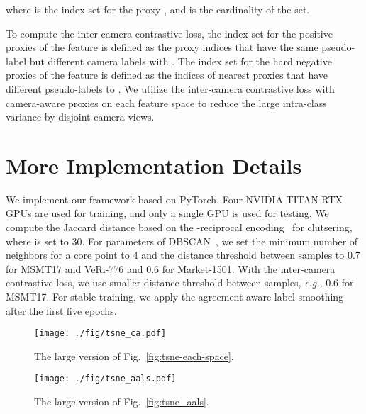 \documentclass[10pt,twocolumn,letterpaper]{article}
\begin{document}
    where  is the index set for the proxy , and  is the cardinality of the set.
    
    To compute the inter-camera contrastive loss, the index set  for the positive proxies of the feature  is defined as the proxy indices that have the same pseudo-label  but different camera labels with .
    The index set  for the hard negative proxies of the feature  is defined as the indices of nearest proxies that have different pseudo-labels to .
    We utilize the inter-camera contrastive loss with camera-aware proxies on each feature space to reduce the large intra-class variance by disjoint camera views.
     \section{More Implementation Details}
\label{sec:implement_details}
    We implement our framework based on PyTorch.
    Four NVIDIA TITAN RTX GPUs are used for training, and only a single GPU is used for testing.
    We compute the Jaccard distance based on the -reciprocal encoding~\cite{zhong2017re} for clutsering, where  is set to 30.
    For parameters of DBSCAN~\cite{ester1996density}, we set the minimum number of neighbors for a core point to 4 and the distance threshold between samples to 0.7 for MSMT17 and VeRi-776 and 0.6 for Market-1501.
    With the inter-camera contrastive loss, we use smaller distance threshold between samples, \textit{e.g.}, 0.6 for MSMT17.
    For stable training, we apply the agreement-aware label smoothing after the first five epochs.
 \begin{figure*}[t]
    \centering
    \texttt{[image: ./fig/tsne\_ca.pdf]}
    \caption{ 
    The large version of Fig.~\ref{fig:tsne-each-space}.
    }
    \label{fig:tsne-each-space-large}
\end{figure*}

\begin{figure*}[t]
    \centering
    \texttt{[image: ./fig/tsne\_aals.pdf]}
    \caption{ 
    The large version of Fig.~\ref{fig:tsne_aals}.
    }
    \label{fig:tsne-aals-large}
\end{figure*} 
 
\end{document}
